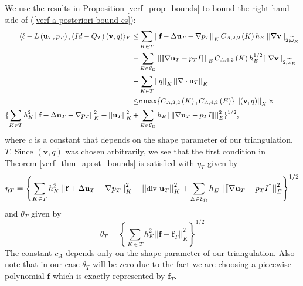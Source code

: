 \documentclass[12pt,a4paper]{article}
\theoremstyle{definition}
\begin{document}
We use the results in Proposition \ref{verf_prop_bounds} to bound the right-hand side of (\ref{verf-a-posteriori-bound-cs}):
\begin{equation}\small
\begin{aligned}\small
\langle \ell -L\left(\textbf{u}_T,p_T\right),\left(Id-Q_T\right)\left(\textbf{v},q\right) \rangle_Y\leq
&\sum_{K\in T}\left|\left|\textbf{f}+\Delta \textbf{u}_T-\nabla p_T \right|\right|_K C_{A,2,2}\left(K\right)h_K \left|\left|\nabla\textbf{v}\right|\right|_{2;\widetilde{\omega}_K}\\
-&\sum_{E\in \mathcal{E}_{\Omega}}\left|\left|\llbracket\nabla \textbf{u}_T-p_TI\rrbracket \right|\right|_EC_{A,4,2}\left(K\right)h_E^{1/2} \left|\left|\nabla\textbf{v}\right|\right|_{2;\widetilde{\omega}_E}\\
-&\sum_{K\in T}\left|\left|q\right|\right|_K\left|\left|\nabla \cdot \textbf{u}_T\right|\right|_K\\
\leq &c\max \{C_{A,2,2}\left(K\right),C_{A,4,2}\left(E\right)\}\left|\left|\left(\textbf{v},q\right)\right|\right|_X\times\\ \{\sum_{K\in T}h^2_K\left|\left|\textbf{f}+\Delta \textbf{u}_T-\nabla p_T \right|\right|_K^2+\left|\left|\textbf{u}_T\right|\right|^2_K+&\sum_{E\in \mathcal{E}_{\Omega}}h_E\left|\left|\llbracket\nabla \textbf{u}_T-p_TI\rrbracket \right|\right|_E^2 \}^{1/2},
\end{aligned}
\end{equation}
where $c$ is a constant that depends on the shape parameter of our triangulation, $T$.  Since $\left(\textbf{v},q\right)$ was chosen arbitrarily, we see that the first condition in Theorem \ref{verf_thm_apost_bounds} is satisfied with $\eta_T$ given by  
\begin{equation}\small
\eta_T=\left\lbrace \sum_{K\in T}h^2_K\left|\left|\textbf{f}+\Delta \textbf{u}_T-\nabla p_T \right|\right|_K^2+\left|\left|\text{div }\textbf{u}_T\right|\right|^2_K+\sum_{E\in \mathcal{E}_{\Omega}}h_E\left|\left|\llbracket\nabla \textbf{u}_T-p_TI\rrbracket \right|\right|_E^2  \right\rbrace ^{1/2}
\end{equation}
and $\theta_T$ given by 
\begin{equation}
\theta_T=\left \lbrace \sum_{K\in T}h^2_K\left|\left|\textbf{f}-\textbf{f}_T\right|\right|^2_K \right \rbrace^{1/2}
\end{equation}
The constant $c_A$ depends only on the shape parameter of our triangulation.  Also note that in our case $\theta_T$ will be zero due to the fact we are choosing a piecewise polynomial $\textbf{f}$ which is exactly represented by $\textbf{f}_T$. 
\end{document}
